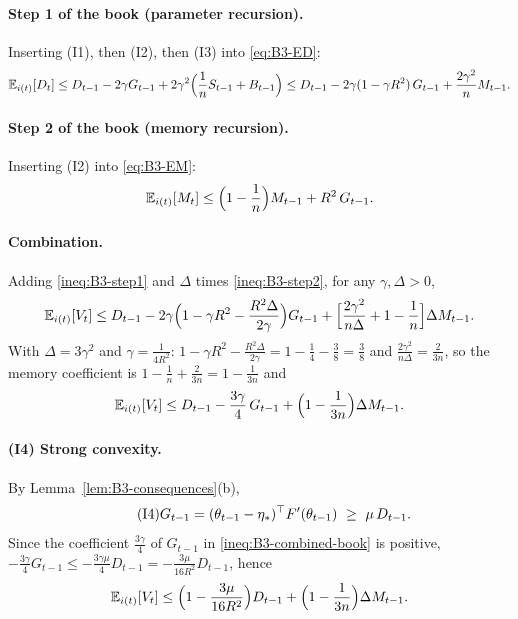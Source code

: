 \paragraph{Step 1 of the book (parameter recursion).} Inserting (I1), then (I2), then (I3) into \eqref{eq:B3-ED}:
\begin{equation}\label{ineq:B3-step1}
\mathbb{E}_{i(t)}[D_t]\le D_{t-1}-2\gamma G_{t-1}+2\gamma^2\Big(\frac1nS_{t-1}+B_{t-1}\Big)
\le D_{t-1}-2\gamma(1-\gamma R^2)\,G_{t-1}+\frac{2\gamma^2}{n}M_{t-1}.
\end{equation}

\paragraph{Step 2 of the book (memory recursion).} Inserting (I2) into \eqref{eq:B3-EM}:
\begin{equation}\label{ineq:B3-step2}
\mathbb{E}_{i(t)}[M_t]\le\Big(1-\frac1n\Big)M_{t-1}+R^2\,G_{t-1}.
\end{equation}

\paragraph{Combination.} Adding \eqref{ineq:B3-step1} and $\Delta$ times \eqref{ineq:B3-step2}, for any $\gamma,\Delta>0$,
\begin{equation}\label{ineq:B3-combined}
\mathbb{E}_{i(t)}[V_t]\le D_{t-1}-2\gamma\Big(1-\gamma R^2-\frac{R^2\Delta}{2\gamma}\Big)G_{t-1}+\Big[\frac{2\gamma^2}{n\Delta}+1-\frac1n\Big]\Delta M_{t-1}.
\end{equation}
With $\Delta=3\gamma^2$ and $\gamma=\frac1{4R^2}$: $1-\gamma R^2-\frac{R^2\Delta}{2\gamma}=1-\frac14-\frac38=\frac38$ and $\frac{2\gamma^2}{n\Delta}=\frac2{3n}$, so the memory coefficient is $1-\frac1n+\frac2{3n}=1-\frac1{3n}$ and
\begin{equation}\label{ineq:B3-combined-book}
\mathbb{E}_{i(t)}[V_t]\le D_{t-1}-\frac{3\gamma}{4}\,G_{t-1}+\Big(1-\frac1{3n}\Big)\Delta M_{t-1}.
\end{equation}

\paragraph{(I4) Strong convexity.} By Lemma~\ref{lem:B3-consequences}(b),
\begin{equation}\label{ineq:B3-I4}\tag{I4}
G_{t-1}=(\theta_{t-1}-\etastar)^\top\Fp(\theta_{t-1})\ \ge\ \mu\,D_{t-1}.
\end{equation}
Since the coefficient $\frac{3\gamma}{4}$ of $G_{t-1}$ in \eqref{ineq:B3-combined-book} is positive, $-\frac{3\gamma}4G_{t-1}\le-\frac{3\gamma\mu}{4}D_{t-1}=-\frac{3\mu}{16R^2}D_{t-1}$, hence
\begin{equation}\label{ineq:B3-two-coeff}
\mathbb{E}_{i(t)}[V_t]\le\Big(1-\frac{3\mu}{16R^2}\Big)D_{t-1}+\Big(1-\frac1{3n}\Big)\Delta M_{t-1}.
\end{equation}

